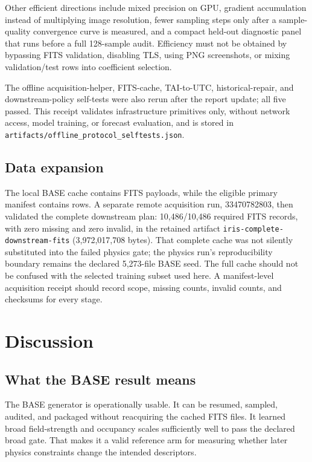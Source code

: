 \documentclass[11pt,oneside]{report}
\begin{document}
Other efficient directions include mixed precision on GPU, gradient accumulation instead of multiplying image resolution, fewer sampling steps only after a sample-quality convergence curve is measured, and a compact held-out diagnostic panel that runs before a full 128-sample audit. Efficiency must not be obtained by bypassing FITS validation, disabling TLS, using PNG screenshots, or mixing validation/test rows into coefficient selection.

The offline acquisition-helper, FITS-cache, TAI-to-UTC, historical-repair, and downstream-policy self-tests were also rerun after the report update; all five passed. This receipt validates infrastructure primitives only, without network access, model training, or forecast evaluation, and is stored in \texttt{artifacts/offline\_protocol\_selftests.json}.

\section{Data expansion}

The local BASE cache contains \AcquiredCount{} FITS payloads, while the eligible primary manifest contains \PrimaryCount{} rows. A separate remote acquisition run, 33470782803, then validated the complete downstream plan: 10,486/10,486 required FITS records, with zero missing and zero invalid, in the retained artifact \texttt{iris-complete-downstream-fits} (3,972,017,708 bytes). That complete cache was not silently substituted into the failed physics gate; the physics run’s reproducibility boundary remains the declared 5,273-file BASE seed. The full cache should not be confused with the selected training subset used here. A manifest-level acquisition receipt should record scope, missing counts, invalid counts, and checksums for every stage.

\chapter{Discussion}

\section{What the BASE result means}

The BASE generator is operationally usable. It can be resumed, sampled, audited, and packaged without reacquiring the cached FITS files. It learned broad field-strength and occupancy scales sufficiently well to pass the declared broad gate. That makes it a valid reference arm for measuring whether later physics constraints change the intended descriptors.
\end{document}
